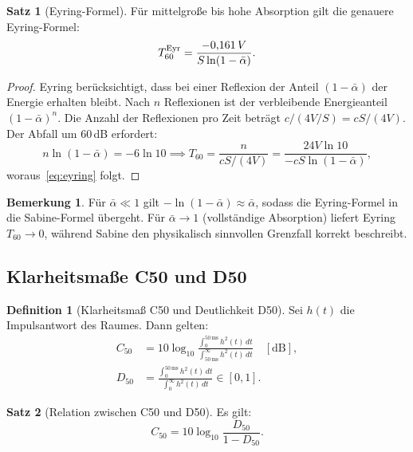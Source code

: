 ﻿\documentclass[12pt, a4paper]{article}
\theoremstyle{definition}
\newtheorem{definition}{Definition}[section]
\newtheorem{satz}{Satz}[section]
\newtheorem{bemerkung}{Bemerkung}[section]
\theoremstyle{remark}
\begin{document}
\begin{satz}[Eyring-Formel]
\label{satz:eyring}
Für mittelgroße bis hohe Absorption gilt die genauere Eyring-Formel:
\begin{equation}
  T_{60}^{\rm Eyr} = \frac{-0{,}161\,V}{S\ln(1-\bar{\alpha})}.
  \label{eq:eyring}
\end{equation}
\end{satz}

\begin{proof}
Eyring berücksichtigt, dass bei einer Reflexion der Anteil $(1-\bar{\alpha})$
der Energie erhalten bleibt. Nach $n$ Reflexionen ist der verbleibende
Energieanteil $(1-\bar{\alpha})^n$. Die Anzahl der Reflexionen pro Zeit
beträgt $c/(4V/S) = cS/(4V)$. Der Abfall um 60\,dB erfordert:
\[
  n\ln(1-\bar{\alpha}) = -6\ln 10 \implies
  T_{60} = \frac{n}{cS/(4V)} = \frac{24V\ln 10}{-cS\ln(1-\bar{\alpha})},
\]
woraus~\eqref{eq:eyring} folgt. 
\end{proof}

\begin{bemerkung}
Für $\bar{\alpha} \ll 1$ gilt $-\ln(1-\bar{\alpha}) \approx \bar{\alpha}$,
sodass die Eyring-Formel in die Sabine-Formel übergeht. Für $\bar{\alpha} \to 1$
(vollständige Absorption) liefert Eyring $T_{60} \to 0$, während Sabine
den physikalisch sinnvollen Grenzfall korrekt beschreibt.
\end{bemerkung}

\subsection{Klarheitsmaße C50 und D50}

\begin{definition}[Klarheitsmaß C50 und Deutlichkeit D50]
Sei $h(t)$ die Impulsantwort des Raumes. Dann gelten:
\begin{align}
  C_{50} &= 10\log_{10}\frac{\int_0^{50\,\text{ms}} h^2(t)\,dt}
                             {\int_{50\,\text{ms}}^\infty h^2(t)\,dt}
  \quad [\text{dB}],
  \label{eq:c50}\\[6pt]
  D_{50} &= \frac{\int_0^{50\,\text{ms}} h^2(t)\,dt}
                  {\int_0^\infty h^2(t)\,dt} \in [0,1].
  \label{eq:d50}
\end{align}
\end{definition}

\begin{satz}[Relation zwischen C50 und D50]
\label{satz:c50_d50}
Es gilt:
\begin{equation}
  C_{50} = 10\log_{10}\frac{D_{50}}{1 - D_{50}}.
  \label{eq:c50_d50}
\end{equation}
\end{satz}
\end{document}
